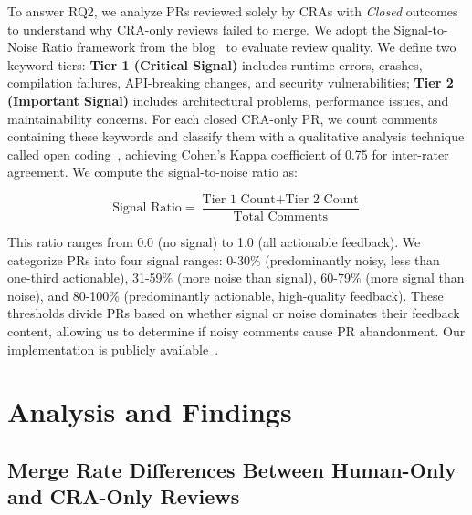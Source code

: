 \documentclass[sigconf]{acmart}
\begin{document}

To answer RQ2, we analyze PRs reviewed solely by CRAs with \textit{Closed} outcomes to understand why CRA-only reviews failed to merge. We adopt the Signal-to-Noise Ratio framework from the blog~\cite{JetXu_2025} to evaluate review quality. We define two keyword tiers: \textbf{Tier 1 (Critical Signal)} includes runtime errors, crashes, compilation failures, API-breaking changes, and security vulnerabilities; \textbf{Tier 2 (Important Signal)} includes architectural problems, performance issues, and maintainability concerns. For each closed CRA-only PR, we count comments containing these keywords and classify them with a qualitative analysis technique called open coding~\cite{saldana2021coding}, achieving Cohen's Kappa coefficient of 0.75 for inter-rater agreement. We compute the signal-to-noise ratio as:

\begin{equation}
\text{Signal Ratio} = \frac{\text{Tier 1 Count} + \text{Tier 2 Count}}{\text{Total Comments}}
\end{equation}


This ratio ranges from 0.0 (no signal) to 1.0 (all actionable feedback). We categorize PRs into four signal ranges: 0-30\% (predominantly noisy, less than one-third actionable), 31-59\% (more noise than signal), 60-79\% (more signal than noise), and 80-100\% (predominantly actionable, high-quality feedback). These thresholds divide PRs based on whether signal or noise dominates their feedback content, allowing us to determine if noisy comments cause PR abandonment. Our implementation is publicly available~\cite{msr2026:challenge:CRA}.


\section{Analysis and Findings}
\subsection{Merge Rate Differences Between Human-Only and CRA-Only Reviews}
\end{document}
